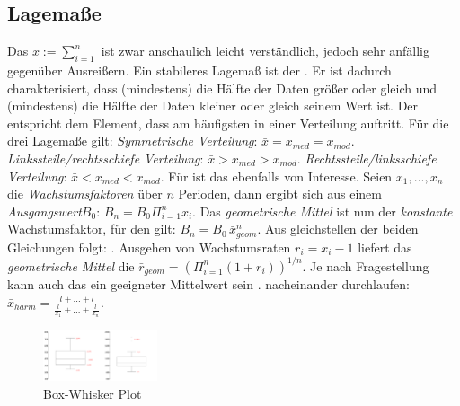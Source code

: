 \subsection{Lagemaße}
Das  $\bar{x} := \sum^n_{i=1}$ ist zwar anschaulich leicht verständlich, jedoch sehr anfällig gegenüber Ausreißern. Ein stabileres Lagemaß ist der . Er ist dadurch charakterisiert, dass (mindestens) die Hälfte der Daten größer oder gleich und (mindestens) die Hälfte der Daten kleiner oder gleich seinem Wert ist.  Der   entspricht dem Element, dass am häufigsten in einer Verteilung auftritt. Für die drei Lagemaße gilt: \emph{Symmetrische Verteilung}: $\bar{x}=x_{med}=x_{mod}$. \emph{Linkssteile/rechtsschiefe Verteilung}: $\bar{x} > x_{med} > x_{mod}$. \emph{Rechtssteile/linksschiefe Verteilung}: $\bar{x}<x_{med}<x_{mod}$. 
Für  ist das  ebenfalls von Interesse. Seien $x_1, ..., x_n$ die \emph{Wachstumsfaktoren} über $n$ Perioden, dann ergibt sich aus einem \emph{Ausgangswert}\linebreak$B_0$: $B_n = B_0 \Pi_{i=1}^nx_i$. Das \emph{geometrische Mittel} ist nun der \emph{konstante} Wachstumsfaktor,  für den gilt: $B_n = B_0\,\bar{x}_{geom}^n$. Aus gleichstellen der beiden Gleichungen folgt: . Ausgehen von Wachstumsraten $r_i = x_i - 1$ liefert das \emph{geometrische Mittel} die  $\bar{r}_{geom} = (\Pi_{i=1}^n(1+r_i))^{1/n}$. 
Je nach Fragestellung kann auch das  ein geeigneter Mittelwert sein .  nacheinander durchlaufen: $\bar{x}_{harm} = \frac{l + ... + l}{\frac{l}{x_1} + ... + \frac{l}{x_n}}$.
\begin{figure}
    \centering
    \includegraphics[width=0.3\textwidth]{images/2.5_boxplot.png}
    \caption{Box-Whisker Plot}
    \vspace{-10mm}
    \label{fig:boxplot}
\end{figure}
